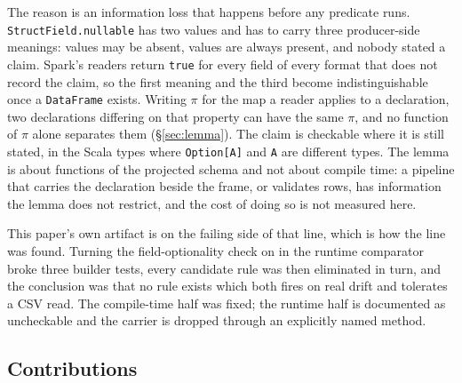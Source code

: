The reason is an information loss that happens before any predicate runs. \texttt{StructField.nullable} has two values and has to carry three producer-side meanings: values may be absent, values are always present, and nobody stated a claim. Spark's readers return \texttt{true} for every field of every format that does not record the claim, so the first meaning and the third become indistinguishable once a \texttt{DataFrame} exists. Writing $\pi$ for the map a reader applies to a declaration, two declarations differing on that property can have the same $\pi$, and no function of $\pi$ alone separates them (\S\ref{sec:lemma}). The claim is checkable where it is still stated, in the Scala types where \texttt{Option[A]} and \texttt{A} are different types. The lemma is about functions of the projected schema and not about compile time: a pipeline that carries the declaration beside the frame, or validates rows, has information the lemma does not restrict, and the cost of doing so is not measured here.

This paper's own artifact is on the failing side of that line, which is how the line was found. Turning the field-optionality check on in the runtime comparator broke three builder tests, every candidate rule was then eliminated in turn, and the conclusion was that no rule exists which both fires on real drift and tolerates a CSV read. The compile-time half was fixed; the runtime half is documented as uncheckable and the carrier is dropped through an explicitly named method.

\subsection{Contributions}

